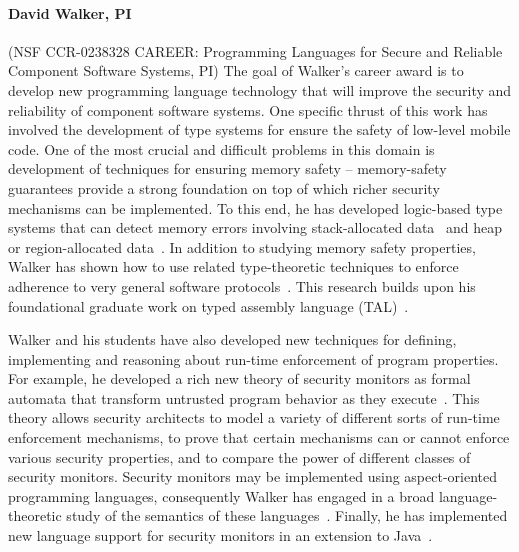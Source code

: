 \documentclass[11pt]{article}
\begin{document}
\paragraph*{David Walker, PI} (NSF CCR-0238328 CAREER: Programming Languages for Secure and Reliable Component Software
Systems, PI)
The goal of Walker's career award is to develop new programming language
technology that will improve the security and reliability of component software systems.  
One specific thrust of this work has involved the development of
type systems for ensure the safety of low-level mobile code.
One of the most crucial and difficult problems in this domain
is development of techniques for ensuring memory safety --
memory-safety guarantees 
provide a strong foundation on top of  which
richer security mechanisms can be implemented.  
To this end, he has developed
logic-based type systems that can detect memory errors involving
stack-allocated data~\cite{ahmed+:stack,jia+:stack} and heap or region-allocated
data~\cite{ahmed+:hierarchical-storage}.  In addition to studying memory safety
properties, Walker has shown how to use related type-theoretic techniques
to enforce adherence to very general software
protocols~\cite{mandelbaum+:refinements}.  This research builds 
upon his foundational graduate work on typed assembly language 
(TAL)~\cite{morrisett+:tal,morrisett+:journal-stal}.


Walker and his students have also developed new techniques for defining,
implementing and reasoning about run-time enforcement of program properties.
For example, he developed a rich new theory of security monitors as formal
automata that transform untrusted program behavior as they 
execute~\cite{ligatti+:edit-automata,ligatti+:renewal}.
This theory allows security
architects to model a variety of different sorts of run-time
enforcement mechanisms, to prove that certain mechanisms can or cannot
enforce various security properties, and to compare the power of
different classes of security monitors.    
Security monitors may be implemented using aspect-oriented 
programming languages, consequently Walker has engaged in a 
broad
language-theoretic study of the semantics of these 
languages~\cite{walker+:aspects,dantas+:harmless-advice,ligatti+:aspectsjournal,dantas+:polyaml}.
Finally, he has implemented new language support for
security monitors in an extension to Java~\cite{bauer+:polymer}.
\end{document}
